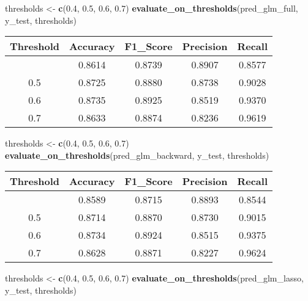 \documentclass[
]{article}
\newenvironment{Shaded}{\begin{snugshade}}{\end{snugshade}}
\newcommand{\FloatTok}[1]{\textcolor[rgb]{0.00,0.00,0.81}{#1}}
\newcommand{\FunctionTok}[1]{\textcolor[rgb]{0.13,0.29,0.53}{\textbf{#1}}}
\newcommand{\NormalTok}[1]{#1}
\newcommand{\OtherTok}[1]{\textcolor[rgb]{0.56,0.35,0.01}{#1}}
\begin{document}
\begin{Shaded}
\begin{Highlighting}[]
\NormalTok{thresholds }\OtherTok{\textless{}{-}} \FunctionTok{c}\NormalTok{(}\FloatTok{0.4}\NormalTok{, }\FloatTok{0.5}\NormalTok{, }\FloatTok{0.6}\NormalTok{, }\FloatTok{0.7}\NormalTok{)}
\FunctionTok{evaluate\_on\_thresholds}\NormalTok{(pred\_glm\_full, y\_test, thresholds)}
\end{Highlighting}
\end{Shaded}

\begin{longtable}[]{@{}ccccc@{}}
\toprule\noalign{}
Threshold & Accuracy & F1\_Score & Precision & Recall \\
\midrule\noalign{}
\endhead
\bottomrule\noalign{}
\endlastfoot
0.4 & 0.8614 & 0.8739 & 0.8907 & 0.8577 \\
0.5 & 0.8725 & 0.8880 & 0.8738 & 0.9028 \\
0.6 & 0.8735 & 0.8925 & 0.8519 & 0.9370 \\
0.7 & 0.8633 & 0.8874 & 0.8236 & 0.9619 \\
\end{longtable}

\begin{Shaded}
\begin{Highlighting}[]
\NormalTok{thresholds }\OtherTok{\textless{}{-}} \FunctionTok{c}\NormalTok{(}\FloatTok{0.4}\NormalTok{, }\FloatTok{0.5}\NormalTok{, }\FloatTok{0.6}\NormalTok{, }\FloatTok{0.7}\NormalTok{)}
\FunctionTok{evaluate\_on\_thresholds}\NormalTok{(pred\_glm\_backward, y\_test, thresholds)}
\end{Highlighting}
\end{Shaded}

\begin{longtable}[]{@{}ccccc@{}}
\toprule\noalign{}
Threshold & Accuracy & F1\_Score & Precision & Recall \\
\midrule\noalign{}
\endhead
\bottomrule\noalign{}
\endlastfoot
0.4 & 0.8589 & 0.8715 & 0.8893 & 0.8544 \\
0.5 & 0.8714 & 0.8870 & 0.8730 & 0.9015 \\
0.6 & 0.8734 & 0.8924 & 0.8515 & 0.9375 \\
0.7 & 0.8628 & 0.8871 & 0.8227 & 0.9624 \\
\end{longtable}

\begin{Shaded}
\begin{Highlighting}[]
\NormalTok{thresholds }\OtherTok{\textless{}{-}} \FunctionTok{c}\NormalTok{(}\FloatTok{0.4}\NormalTok{, }\FloatTok{0.5}\NormalTok{, }\FloatTok{0.6}\NormalTok{, }\FloatTok{0.7}\NormalTok{)}
\FunctionTok{evaluate\_on\_thresholds}\NormalTok{(pred\_glm\_lasso, y\_test, thresholds)}
\end{Highlighting}
\end{Shaded}
\end{document}
